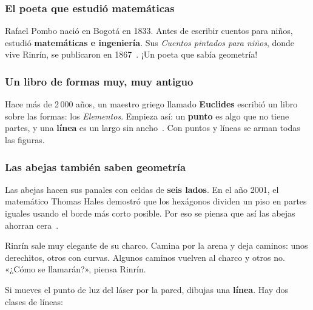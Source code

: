 \documentclass[11pt]{article}
\begin{document}
\subsubsection*{El poeta que estudió matemáticas}
Rafael Pombo nació en Bogotá en 1833. Antes de escribir cuentos para niños,
estudió \textbf{matemáticas e ingeniería}. Sus \emph{Cuentos pintados para
niños}, donde vive Rinrín, se publicaron en 1867~\cite{banrep}. ¡Un poeta
que sabía geometría!

\subsubsection*{Un libro de formas muy, muy antiguo}
Hace más de 2\,000 años, un maestro griego llamado \textbf{Euclides}
escribió un libro sobre las formas: los \emph{Elementos}. Empieza así: un
\textbf{punto} es algo que no tiene partes, y una \textbf{línea} es un largo
sin ancho~\cite{euclides}. Con puntos y líneas se arman todas las figuras.

\subsubsection*{Las abejas también saben geometría}
Las abejas hacen sus panales con celdas de \textbf{seis lados}. En el año
2001, el matemático Thomas Hales demostró que los hexágonos dividen un piso
en partes iguales usando el borde más corto posible. Por eso se piensa que
así las abejas ahorran cera~\cite{hales}.

\label{tema:lineas}

\begin{hilo}
Rinrín sale muy elegante de su charco. Camina por la arena y deja caminos:
unos derechitos, otros con curvas. Algunos caminos vuelven al charco y otros
no. «¿Cómo se llamarán?», piensa Rinrín.
\end{hilo}

Si mueves el punto de luz del láser por la pared, dibujas una
\textbf{línea}. Hay dos clases de líneas:

\begin{center}
\end{center}
\end{document}
